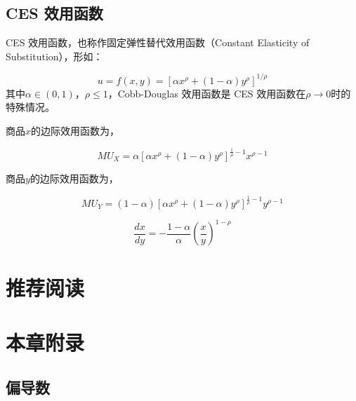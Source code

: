 \subsection[CES]{CES 效用函数}

CES 效用函数，也称作固定弹性替代效用函数（Constant Elasticity of Substitution），形如：

\begin{equation}
u=f(x,y)=\left[\alpha x^\rho +(1-\alpha)y^\rho\right]^{1/\rho}
\label{eq:ces-utility-function}
\end{equation}
其中$\alpha\in(0,1)$，$\rho\leq 1$，Cobb-Douglas 效用函数是 CES 效用函数在$\rho \to 0$时的特殊情况。

商品$x$的边际效用函数为，

\[MU_X=\alpha \left[\alpha x^\rho +(1-\alpha)y^\rho\right]^{\frac{1}{\rho}-1} x^{\rho-1}\]

商品$y$的边际效用函数为，

\[MU_Y=(1-\alpha)\left[\alpha x^\rho +(1-\alpha)y^\rho\right]^{\frac{1}{\rho}-1} y^{\rho-1}\]

\[\frac{dx}{dy}=-\frac{1-\alpha}{\alpha}\left(\frac{x}{y}\right)^{1-\rho}\]


\section*{推荐阅读}



\newpage
\section*{本章附录}
\label{sec:appendix-utility}

\subsection*{偏导数}